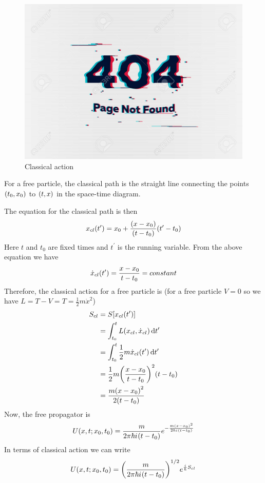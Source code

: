 		
		\begin{figure}
			\centering
			\includegraphics[width=0.5\linewidth]{Pictures/not-found.jpg}
			\caption{Classical action}
		\end{figure}
	
		For a free particle, the classical path is the straight line connecting the points $\qty(t_0, x_0)$ to $\qty(t, x)$ in the space-time diagram.
		
		The equation for the classical path is then
		\begin{equation}
			x_{cl}\qty(t^\prime) = x_0 + \frac{\qty(x-x_0)}{\qty(t-t_0)} \qty(t^\prime - t_0)
		\end{equation}
		Here $t$ and $t_0$ are fixed times and $t^\prime$  is the running variable. From the above equation we have
		\begin{equation}
			\dot{x}_{cl}\qty(t^\prime) = \frac{x-x_0}{t-t_0} = constant
		\end{equation}
		Therefore, the classical action for a free particle is (for a free particle $V=0$ so we have $L=T-V=T=\frac{1}{2} m \dot{x}^2$)
		\begin{align}
			S_{cl} 
			&= S\qty[x_{cl}\qty(t^\prime)] \\
			&= \int_{t_0}^{t} L(x_{cl}, \dot{x}_{cl}) \dd{t^\prime} \\
			&= \int_{t_0}^{t} \frac{1}{2} m \dot{x}_{cl}\qty(t^\prime) \dd{t^\prime} \\
			&= \frac{1}{2} m \qty(\frac{x-x_0}{t-t_0})^2 \qty(t-t_0) \\
			&= \frac{m \qty(x-x_0)^2}{2 \qty(t-t_0)}
		\end{align}
		Now, the free propagator is
		\begin{equation}
			U(x,t;x_0, t_0) = \frac{m}{2\pi \hbar {i\mkern1mu} \qty(t-t_0)} e^{-\frac{m\qty(x-x_0)^2}{2\hbar {i\mkern1mu} \qty(t-t_0)}}
		\end{equation}
		In terms of classical action we can write
		\begin{equation}
			U(x,t;x_0,t_0) = \qty(\frac{m}{2\pi \hbar {i\mkern1mu}\qty(t-t_0)})^{1/2} e^{\frac{i}{\hbar} S_{cl}}
		\end{equation}
		
